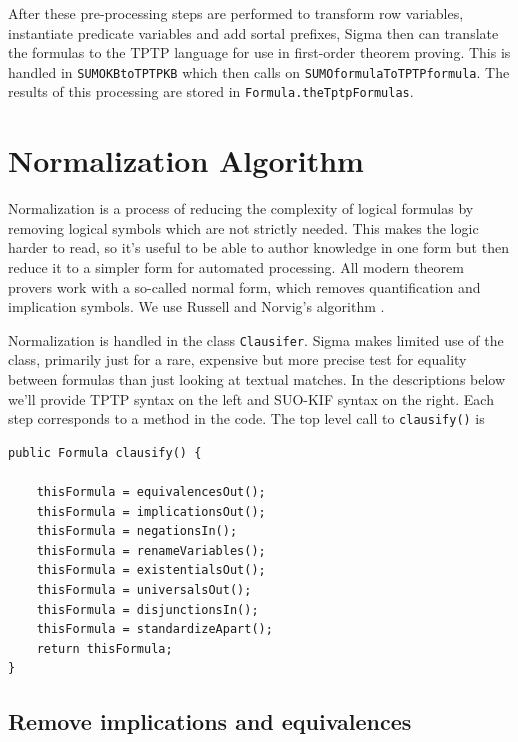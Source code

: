\documentclass{book}
\begin{document}
After these pre-processing steps are performed to transform row variables, instantiate
predicate variables and add sortal prefixes, Sigma then can translate the formulas
to the TPTP language for use in first-order theorem proving.  This is handled in
\texttt{SUMOKBtoTPTPKB} which then calls on \texttt{SUMOformulaToTPTPformula}.  The
results of this processing are stored in \texttt{Formula.theTptpFormulas}.


\section{Normalization Algorithm}
\label{chap:SUMOInfe:sec:Norm}

Normalization is a process of reducing the complexity of logical formulas by
removing logical symbols which are not strictly needed.  This makes the logic
harder to read, so it's useful to be able to author knowledge in one form but
then reduce it to a simpler form for automated processing.  All modern theorem
provers work with a so-called normal form, which removes quantification and
implication symbols.  We use Russell and Norvig's algorithm \cite{RN:AI-2009}.

Normalization is handled in the class
\texttt{Clausifer}. Sigma makes limited use of the
class, primarily just for a rare, expensive but more precise test for equality
between formulas than just looking at textual matches.  In the descriptions
below we'll provide TPTP syntax on the left and SUO-KIF syntax on the right.
Each step corresponds to a method in the code.  The top level call to
\texttt{clausify()} is

\begin{lstlisting}[basicstyle=\ttfamily\small\bfseries]
public Formula clausify() {

    thisFormula = equivalencesOut();
    thisFormula = implicationsOut();
    thisFormula = negationsIn();
    thisFormula = renameVariables();
    thisFormula = existentialsOut();
    thisFormula = universalsOut();
    thisFormula = disjunctionsIn();
    thisFormula = standardizeApart();
    return thisFormula;
}
\end{lstlisting}

\subsection{Remove implications and equivalences}
\end{document}
